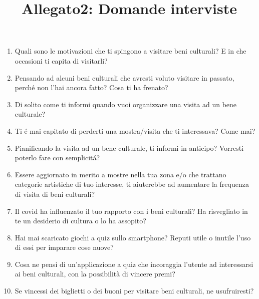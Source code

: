 \documentclass{article}
\title{\textbf{Allegato2: Domande interviste}}
\date{}
\begin{document}
\maketitle

\begin{enumerate}
\item Quali sono le motivazioni che ti spingono a visitare beni culturali? E in che occasioni ti capita di visitarli?
\item Pensando ad alcuni beni culturali che avresti voluto visitare in passato, perché non l'hai ancora fatto? Cosa ti ha frenato?
\item Di solito come ti informi quando vuoi organizzare una visita ad un bene culturale?
\item Ti é mai capitato di perderti una mostra/visita che ti interessava? Come mai?
\item Pianificando la visita ad un bene culturale, ti informi in anticipo? Vorresti poterlo fare con semplicitá?
\item Essere aggiornato in merito a mostre nella tua zona e/o che trattano categorie artistiche di tuo interesse, ti aiuterebbe ad aumentare la frequenza di visita di beni culturali?
\item Il covid ha influenzato il tuo rapporto con i beni culturali? Ha risvegliato in te un desiderio di cultura o lo ha assopito?
\item Hai mai scaricato giochi a quiz sullo smartphone? Reputi utile o inutile l’uso di essi per imparare cose nuove?
\item Cosa ne pensi di un’applicazione a quiz che incoraggia l’utente ad interessarsi ai beni culturali, con la possibilità di vincere premi?
\item Se vincessi dei biglietti o dei buoni per visitare beni culturali, ne usufruiresti?
\end{enumerate}
\end{document}
